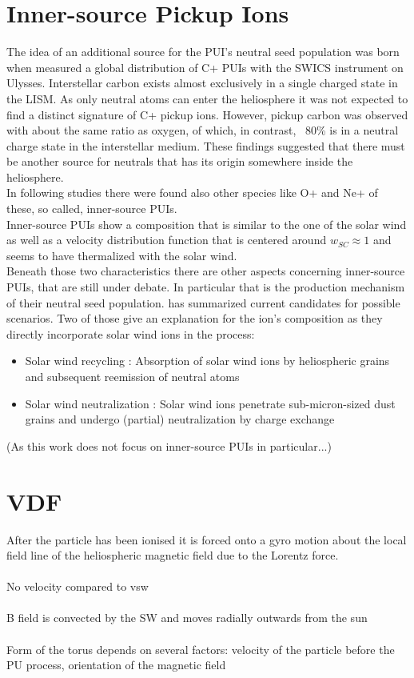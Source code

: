 \section{Inner-source Pickup Ions}
The idea of an additional source for the PUI's neutral seed population was born when \citet{geiss_1995a} measured a global distribution of C+ PUIs with the SWICS instrument on Ulysses. 
Interstellar carbon exists almost exclusively in a single charged state \citep{Frisch} in the LISM. As only neutral atoms can enter the heliosphere it was not expected to find a distinct signature of C+ pickup ions.
However, pickup carbon was observed with about the same ratio as oxygen, of which, in contrast, ~80\% is in a neutral charge state in the interstellar medium.
These findings suggested that there must be another source for neutrals that has its origin somewhere inside the heliosphere. \\
In following studies \citep[e.g.][]{geiss_1995b} there were found also other species like O+ and Ne+ of these, so called, inner-source PUIs.
\\
Inner-source PUIs show a composition that is similar to the one of the solar wind \citep{gloeckler2000_innersource, allegrini_2005} as well as a velocity distribution function that is centered around $w_{SC} \approx 1$ \citep{schwadron_2000} and seems to have thermalized with the solar wind.
\\
Beneath those two characteristics there are other aspects concerning inner-source PUIs, that are still under debate. In particular that is the production mechanism of their neutral seed population.
\citet{allegrini_2005} has summarized current candidates for possible scenarios. Two of those give an explanation for the ion's composition as they directly incorporate solar wind ions in the process:
\begin{itemize}
	\item Solar wind recycling \citep{gloeckler2000_innersource, schwadron_2000}: Absorption of solar wind ions by heliospheric grains and subsequent reemission of neutral atoms
	\item Solar wind neutralization \citep{wimmer_2002}: Solar wind ions penetrate sub-micron-sized dust grains and undergo (partial) neutralization by charge exchange
\end{itemize}
(As this work does not focus on inner-source PUIs in particular...)


\section{VDF}
After the particle has been ionised it is forced onto a gyro motion about the local field line of the heliospheric magnetic field due to the Lorentz force. 
\\ \\
No velocity compared to vsw
\\ \\
B field is convected by the SW and moves radially outwards from the sun
\\ \\
Form of the torus depends on several factors: velocity of the particle before the PU process, orientation of the magnetic field